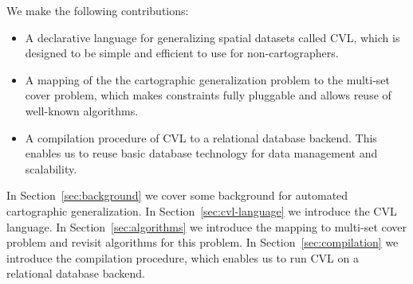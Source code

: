 We make the following contributions:

\begin{itemize}
\item A declarative language for generalizing spatial datasets called CVL, which is designed to be simple and efficient to use for non-cartographers. 
\item A mapping of the the cartographic generalization problem to the multi-set cover problem, which makes constraints fully pluggable and allows reuse of well-known algorithms.
\item A compilation procedure of CVL to a relational database backend. This enables us to reuse basic database technology for data management and scalability.
\end{itemize}

In Section~\ref{sec:background} we cover some background for automated cartographic generalization. In Section~\ref{sec:cvl-language} we introduce the CVL language. In Section~\ref{sec:algorithms} we introduce the mapping to multi-set cover problem and revisit algorithms for this problem. In Section~\ref{sec:compilation} we introduce the compilation procedure, which enables us to run CVL on a relational database backend.